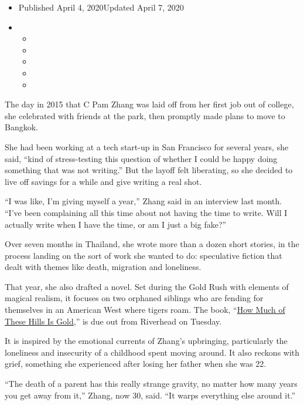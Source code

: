 \begin{itemize}
\item
  Published April 4, 2020Updated April 7, 2020
\item
  \begin{itemize}
  \item
  \item
  \item
  \item
  \item
  \end{itemize}
\end{itemize}

The day in 2015 that C Pam Zhang was laid off from her first job out of
college, she celebrated with friends at the park, then promptly made
plans to move to Bangkok.

She had been working at a tech start-up in San Francisco for several
years, she said, ``kind of stress-testing this question of whether I
could be happy doing something that was not writing.'' But the layoff
felt liberating, so she decided to live off savings for a while and give
writing a real shot.

``I was like, I'm giving myself a year,'' Zhang said in an interview
last month. ``I've been complaining all this time about not having the
time to write. Will I actually write when I have the time, or am I just
a big fake?''

Over seven months in Thailand, she wrote more than a dozen short
stories, in the process landing on the sort of work she wanted to do:
speculative fiction that dealt with themes like death, migration and
loneliness.

That year, she also drafted a novel. Set during the Gold Rush with
elements of magical realism, it focuses on two orphaned siblings who are
fending for themselves in an American West where tigers roam. The book,
``\href{https://www.nytimes.com/2020/04/07/books/review/how-much-of-these-hills-is-gold-c-pam-zhang.html}{How
Much of These Hills Is Gold},'' is due out from Riverhead on Tuesday.

It is inspired by the emotional currents of Zhang's upbringing,
particularly the loneliness and insecurity of a childhood spent moving
around. It also reckons with grief, something she experienced after
losing her father when she was 22.

``The death of a parent has this really strange gravity, no matter how
many years you get away from it,'' Zhang, now 30, said. ``It warps
everything else around it.''

